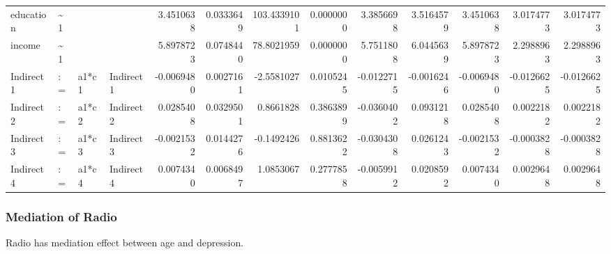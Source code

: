 \documentclass[
]{article}
\begin{document}
\begin{table}[!h]
\begin{tabular}[t]{llllrrrrrrrrr}
\addlinespace
education & \textasciitilde{}1 &  &  & 3.4510638 & 0.0333649 & 103.4339101 & 0.0000000 & 3.3856698 & 3.5164579 & 3.4510638 & 3.0174773 & 3.0174773\\
income & \textasciitilde{}1 &  &  & 5.8978723 & 0.0748440 & 78.8021959 & 0.0000000 & 5.7511808 & 6.0445639 & 5.8978723 & 2.2988963 & 2.2988963\\
Indirect1 & := & a1*c1 & Indirect1 & -0.0069480 & 0.0027161 & -2.5581027 & 0.0105245 & -0.0122715 & -0.0016246 & -0.0069480 & -0.0126625 & -0.0126625\\
Indirect2 & := & a1*c2 & Indirect2 & 0.0285408 & 0.0329501 & 0.8661828 & 0.3863899 & -0.0360402 & 0.0931218 & 0.0285408 & 0.0022182 & 0.0022182\\
Indirect3 & := & a1*c3 & Indirect3 & -0.0021532 & 0.0144276 & -0.1492426 & 0.8813622 & -0.0304308 & 0.0261243 & -0.0021532 & -0.0003828 & -0.0003828\\
\addlinespace
Indirect4 & := & a1*c4 & Indirect4 & 0.0074340 & 0.0068497 & 1.0853067 & 0.2777858 & -0.0059912 & 0.0208592 & 0.0074340 & 0.0029648 & 0.0029648\\
\bottomrule
\end{tabular}
\end{table}

\newpage

\hypertarget{mediation-of-radio}{%
\subsubsection{Mediation of Radio}\label{mediation-of-radio}}

Radio has mediation effect between age and depression.
\end{document}
